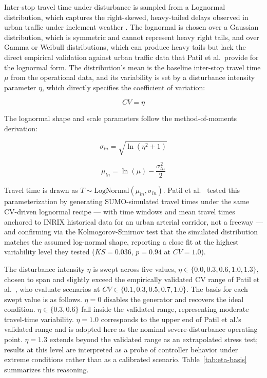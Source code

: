 Inter-stop travel time under disturbance is sampled from a Lognormal distribution, which captures the right-skewed, heavy-tailed delays observed in urban traffic under inclement weather \cite{Patil2025Conformal}. The lognormal is chosen over a Gaussian distribution, which is symmetric and cannot represent heavy right tails, and over Gamma or Weibull distributions, which can produce heavy tails but lack the direct empirical validation against urban traffic data that Patil et al.\ provide for the lognormal form. The distribution's mean is the baseline inter-stop travel time $\mu$ from the operational data, and its variability is set by a disturbance intensity parameter $\eta$, which directly specifies the coefficient of variation:

\begin{equation} CV = \eta \label{eq:cv_eta} \end{equation}

The lognormal shape and scale parameters follow the method-of-moments derivation:

\begin{equation} \sigma_{ln} = \sqrt{\ln(\eta^2 + 1)} \label{eq:sigma_ln} \end{equation}

\begin{equation} \mu_{ln} = \ln(\mu) - \frac{\sigma_{ln}^2}{2} \label{eq:mu_ln} \end{equation}

Travel time is drawn as $T \sim \text{LogNormal}(\mu_{ln}, \sigma_{ln})$. Patil et al.~\cite{Patil2025Conformal} tested this parameterization by generating SUMO-simulated travel times under the same CV-driven lognormal recipe --- with time windows and mean travel times anchored to INRIX historical data for an urban arterial corridor, not a freeway --- and confirming via the Kolmogorov-Smirnov test that the simulated distribution matches the assumed log-normal shape, reporting a close fit at the highest variability level they tested ($KS = 0.036$, $p = 0.94$ at $CV = 1.0$).

The disturbance intensity $\eta$ is swept across five values, $\eta \in \{0.0, 0.3, 0.6, 1.0, 1.3\}$, chosen to span and slightly exceed the empirically validated CV range of Patil et al.~\cite{Patil2025Conformal}, who evaluate scenarios at $CV \in \{0.1, 0.3, 0.5, 0.7, 1.0\}$. The basis for each swept value is as follows. $\eta = 0$ disables the generator and recovers the ideal condition. $\eta \in \{0.3, 0.6\}$ fall inside the validated range, representing moderate travel-time variability. $\eta = 1.0$ corresponds to the upper end of Patil et al.'s validated range and is adopted here as the nominal severe-disturbance operating point. $\eta = 1.3$ extends beyond the validated range as an extrapolated stress test; results at this level are interpreted as a probe of controller behavior under extreme conditions rather than as a calibrated scenario. Table~\ref{tab:eta-basis} summarizes this reasoning.

